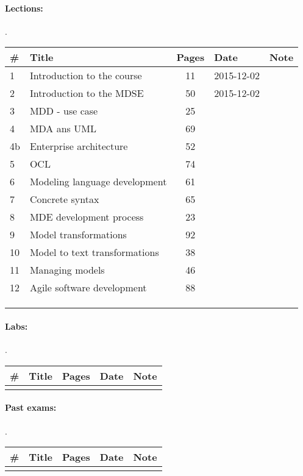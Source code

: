 \documentclass[a4paper,12pt]{article} %
\begin{document}
\paragraph{Lections:} .\\
\begin{tabularx}{\textwidth}{|l|X|c|l|c|}
	\hline
	\# & Title & Pages & Date & Note \\
	\hline
	1 & Introduction to the course & 11 & 2015-12-02 &  \\
	\hline
	2 & Introduction to the MDSE & 50 & 2015-12-02 &  \\
	\hline
	3 & MDD - use case & 25 &  &  \\
	\hline
	4 & MDA ans UML & 69 &  &  \\
	\hline
	4b & Enterprise architecture & 52 &  &  \\
	\hline
	5 & OCL & 74 &  &  \\
	\hline
	6 & Modeling language development & 61 &  &  \\
	\hline
	7 & Concrete syntax & 65 &  &  \\
	\hline
	8 & MDE development process & 23 &  &  \\
	\hline
	9 & Model transformations & 92 &  &  \\
	\hline
	10 & Model to text transformations & 38 &  &  \\
	\hline
	11 & Managing models & 46 &  &  \\
	\hline
	12 & Agile software development & 88 &  &  \\
	\hline
	&  &  &  &  \\
	\hline
	&  &  &  &  \\
	\hline
	&  &  &  &  \\
	\hline
\end{tabularx}

\paragraph{Labs:}.\\
\begin{tabularx}{\textwidth}{|l|X|c|l|c|}
	\hline
	\# & Title & Pages & Date & Note \\
	\hline
	&  &  &  &  \\
	\hline
\end{tabularx}

\paragraph{Past exams:}.\\
\begin{tabularx}{\textwidth}{|l|X|c|l|c|}
	\hline
	\# & Title & Pages & Date & Note \\
	\hline
	&  &  &  &  \\
	\hline
\end{tabularx}
\end{document}
